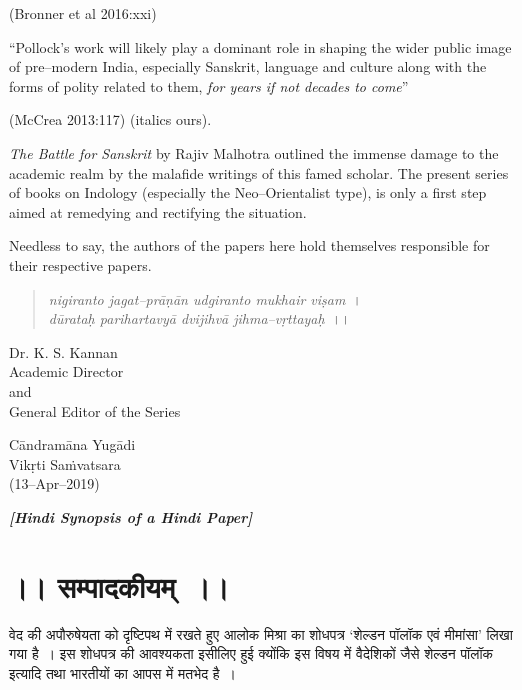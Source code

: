 \hfill (Bronner et al 2016:xxi)

\begin{myquote}
“Pollock’s work will likely play a dominant role in shaping the wider public image of pre–modern India, especially Sanskrit, language and culture along with the forms of polity related to them, \textit{for years if not decades to come}” 
\end{myquote}

\hfill (McCrea 2013:117) (italics ours).

\textit{The Battle for Sanskrit} by Rajiv Malhotra outlined the immense damage to the academic realm by the malafide writings of this famed scholar. The present series of books on Indology (especially the Neo–Orientalist type), is only a first step aimed at remedying and rectifying the situation.

\delimiter

Needless to say, the authors of the papers here hold themselves responsible for their respective papers.

\begin{verse}
\textit{nigiranto jagat–prāṇān udgiranto mukhair viṣam}~।\\\textit{dūrataḥ parihartavyā dvijihvā jihma–vṛttayaḥ}~।।
\end{verse}

\delimiter

\begin{flushright}
Dr. K. S. Kannan\\ Academic Director\\ and\\ General Editor of the Series
\end{flushright}

Cāndramāna Yugādi\\ Vikṛti Saṁvatsara\\ (13–Apr–2019)

\begin{center}
\textbf{\textit{[Hindi Synopsis of a Hindi Paper]}}
\end{center}

\section*{।। सम्पादकीयम्~।।}

वेद की अपौरुषेयता को दृष्टिपथ में रखते हुए आलोक मिश्रा का शोधपत्र ‘शेल्डन पॉलॉक एवं मीमांसा’ लिखा गया है~। इस शोधपत्र की आवश्यकता इसीलिए हुई क्योंकि इस विषय में वैदेशिकों जैसे शेल्डन पॉलॉक इत्यादि तथा भारतीयों का आपस में मतभेद है~।

